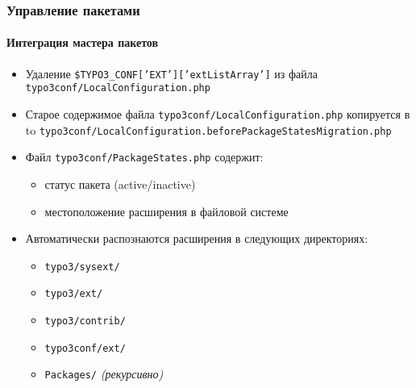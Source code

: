 
\begin{frame}[fragile]
	\frametitle{Управление пакетами}
	\framesubtitle{Интеграция мастера пакетов}

	\begin{itemize}
		\item Удаление \texttt{\$TYPO3\_CONF['EXT']['extListArray']} из файла\newline
			\smaller\texttt{typo3conf/LocalConfiguration.php}\normalsize

		\item Старое содержимое файла \small\texttt{typo3conf/LocalConfiguration.php} копируется в
		to\normalsize\newline
			\smaller\texttt{typo3conf/LocalConfiguration.beforePackageStatesMigration.php}\normalsize

		\item Файл \texttt{typo3conf/PackageStates.php} содержит:

			\begin{itemize}
				\item статус пакета (active/inactive)
				\item местоположение расширения в файловой системе
			\end{itemize}

		\item Автоматически распознаются расширения в следующих директориях:

			\begin{itemize}
				\item \texttt{typo3/sysext/}
				\item \texttt{typo3/ext/}
				\item \texttt{typo3/contrib/}
				\item \texttt{typo3conf/ext/}
				\item \texttt{Packages/} \emph{(рекурсивно)}
			\end{itemize}

	\end{itemize}

\end{frame}


